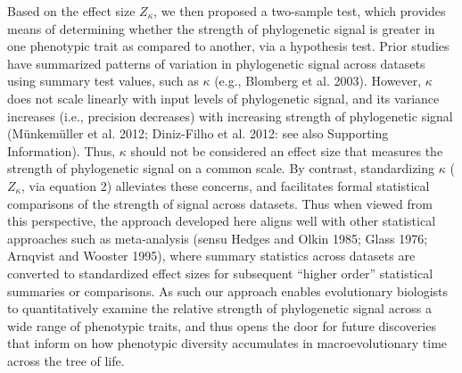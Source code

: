 \documentclass[]{article}
\begin{document}
Based on the effect size \(Z_\kappa\), we then proposed a two-sample
test, which provides means of determining whether the strength of
phylogenetic signal is greater in one phenotypic trait as compared to
another, via a hypothesis test. Prior studies have summarized patterns
of variation in phylogenetic signal across datasets using summary test
values, such as \(\kappa\) (e.g., Blomberg et al. 2003). However,
\(\kappa\) does not scale linearly with input levels of phylogenetic
signal, and its variance increases (i.e., precision decreases) with
increasing strength of phylogenetic signal (Münkemüller et al. 2012;
Diniz-Filho et al. 2012: see also Supporting Information). Thus,
\(\kappa\) should not be considered an effect size that measures the
strength of phylogenetic signal on a common scale. By contrast,
standardizing \(\kappa\) (\(Z_\kappa\), via equation 2) alleviates these
concerns, and facilitates formal statistical comparisons of the strength
of signal across datasets. Thus when viewed from this perspective, the
approach developed here aligns well with other statistical approaches
such as meta-analysis (sensu Hedges and Olkin 1985; Glass 1976; Arnqvist
and Wooster 1995), where summary statistics across datasets are
converted to standardized effect sizes for subsequent ``higher order''
statistical summaries or comparisons. As such our approach enables
evolutionary biologists to quantitatively examine the relative strength
of phylogenetic signal across a wide range of phenotypic traits, and
thus opens the door for future discoveries that inform on how phenotypic
diversity accumulates in macroevolutionary time across the tree of life.
\hfill\break
\end{document}
